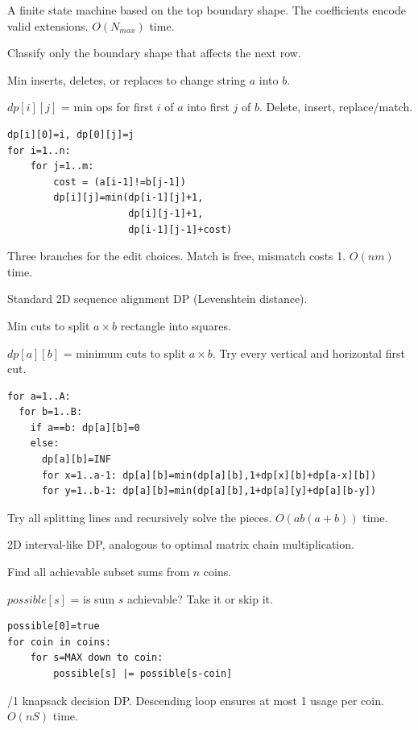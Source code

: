 \Solution A finite state machine based on the top boundary shape. The coefficients encode valid extensions. $O(N_{max})$ time.

\Analysis Classify only the boundary shape that affects the next row.


\Problem Min inserts, deletes, or replaces to change string $a$ into $b$.

\State $dp[i][j]$ = min ops for first $i$ of $a$ into first $j$ of $b$.
\Trans Delete, insert, replace/match.
\begin{lstlisting}
dp[i][0]=i, dp[0][j]=j
for i=1..n:
    for j=1..m:
        cost = (a[i-1]!=b[j-1])
        dp[i][j]=min(dp[i-1][j]+1,
                     dp[i][j-1]+1,
                     dp[i-1][j-1]+cost)
\end{lstlisting}

\Solution Three branches for the edit choices. Match is free, mismatch costs 1. $O(nm)$ time.

\Analysis Standard 2D sequence alignment DP (Levenshtein distance).


\Problem Min cuts to split $a \times b$ rectangle into squares.

\State $dp[a][b]$ = minimum cuts to split $a\times b$.
\Trans Try every vertical and horizontal first cut.
\begin{lstlisting}
for a=1..A:
  for b=1..B:
    if a==b: dp[a][b]=0
    else:
      dp[a][b]=INF
      for x=1..a-1: dp[a][b]=min(dp[a][b],1+dp[x][b]+dp[a-x][b])
      for y=1..b-1: dp[a][b]=min(dp[a][b],1+dp[a][y]+dp[a][b-y])
\end{lstlisting}

\Solution Try all splitting lines and recursively solve the pieces. $O(ab(a+b))$ time.

\Analysis 2D interval-like DP, analogous to optimal matrix chain multiplication.


\Problem Find all achievable subset sums from $n$ coins.

\State $possible[s]$ = is sum $s$ achievable?
\Trans Take it or skip it.
\begin{lstlisting}
possible[0]=true
for coin in coins:
    for s=MAX down to coin:
        possible[s] |= possible[s-coin]
\end{lstlisting}

/1 knapsack decision DP. Descending loop ensures at most 1 usage per coin. $O(nS)$ time.


